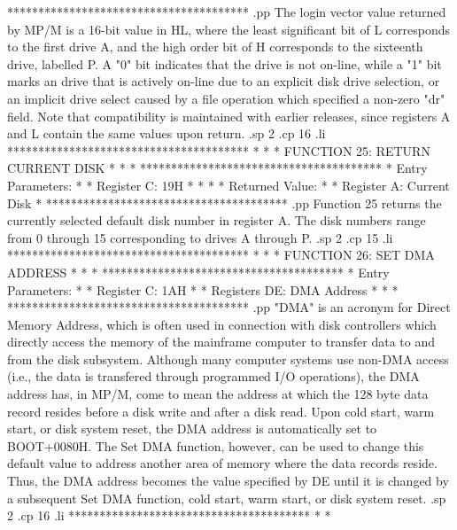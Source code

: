 ***************************************
.pp
The login vector value returned by MP/M is a 16-bit
value in HL, where the least significant bit of L corresponds
to the first drive A, and the high order bit of H corresponds
to the sixteenth drive, labelled P.
A "0" bit indicates that the drive is not on-line, while
a "1" bit marks an drive that is actively on-line due
to an explicit disk drive selection, or an implicit drive
select caused by a file operation which specified a
non-zero "dr" field.
Note that compatibility
is maintained with earlier releases, since registers A and
L contain the same values upon return.
.sp 2
.cp 16
.li
***************************************
*                                     *
*  FUNCTION 25: RETURN CURRENT DISK   *
*                                     *
***************************************
*  Entry Parameters:                  *
*      Register   C:  19H             *
*                                     *
*  Returned   Value:                  *
*      Register   A:  Current Disk    *
***************************************
.pp
Function 25 returns the currently selected default disk
number in register A.  The disk numbers range from 0 through
15 corresponding to drives A through P.
.sp 2
.cp 15
.li
***************************************
*                                     *
*  FUNCTION 26: SET DMA ADDRESS       *
*                                     *
***************************************
*  Entry Parameters:                  *
*      Register   C:  1AH             *
*      Registers DE:  DMA Address     *
*                                     *
***************************************
.pp
"DMA" is an acronym for Direct Memory Address, which is often
used in connection with disk controllers which directly
access the memory of the mainframe computer to transfer
data to and from the disk subsystem.  Although many
computer systems use non-DMA access (i.e., the data is
transfered through programmed I/O operations), the DMA
address has, in MP/M, come to mean the address at which
the 128 byte data record resides before a disk write
and after a disk read.  Upon cold start, warm start, or
disk system reset, the DMA address is automatically
set to BOOT+0080H.  The Set DMA function, however, can
be used to change this default value to address another
area of memory where the data records reside.
Thus, the DMA address becomes the value specified by
DE until it is changed by a subsequent Set DMA function,
cold start, warm start, or disk system reset.
.sp 2
.cp 16
.li
***************************************
*                                     *
